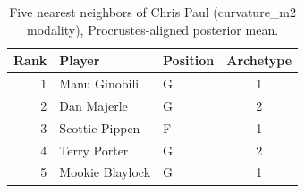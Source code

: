 \begin{table}[htbp]
  \centering\small
  \begin{tabular}{rllc}
    \toprule
    Rank & Player & Position & Archetype \\
    \midrule
    1 & Manu Ginobili & G & 1 \\
    2 & Dan Majerle & G & 2 \\
    3 & Scottie Pippen & F & 1 \\
    4 & Terry Porter & G & 2 \\
    5 & Mookie Blaylock & G & 1 \\
    \bottomrule
  \end{tabular}
  \caption{Five nearest neighbors of Chris Paul (curvature_m2 modality), Procrustes-aligned posterior mean.}
  \label{tab:Chris_Paul_neighbors_curvature_m2}
\end{table}

